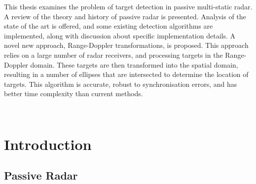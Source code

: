 \documentclass[12pt,openany,a4paper]{book}
\begin{document}

This thesis examines the problem of target detection in passive multi-static radar. A review of the theory and history of passive radar is presented. Analysis of the state of the art is offered, and some existing detection algorithms are implemented, along with discussion about specific implementation details. A novel new approach, Range-Doppler transformations, is proposed. This approach relies on a large number of radar receivers, and processing targets in the Range-Doppler domain. These targets are then transformed into the spatial domain, resulting in a number of ellipses that are intersected to determine the location of targets. This algorithm is accurate, robust to synchronisation errors, and has better time complexity than current methods.

\tableofcontents

\listoffigures
{}


% 

\newpage
\verb+ +
 
\cleardoublepage

\mainmatter


%
%
%
%	
%	

\chapter{Introduction}

\section{Passive Radar}
\end{document}
